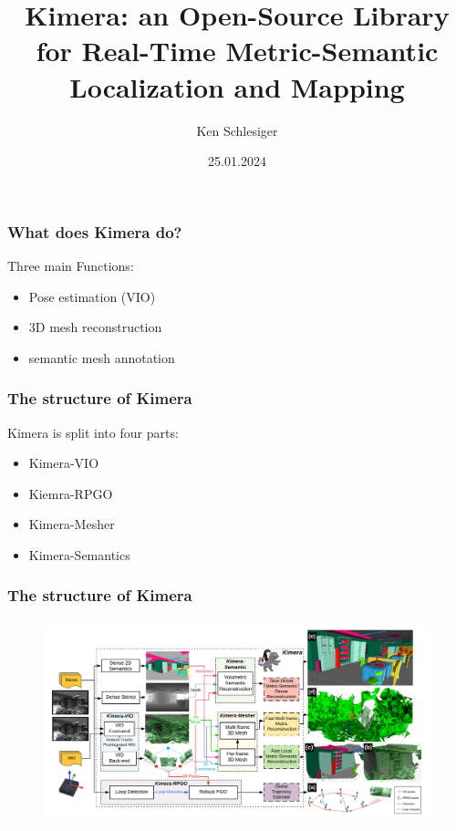 \documentclass[11pt]{beamer}
\title{Kimera: an Open-Source Library for Real-Time
Metric-Semantic Localization and Mapping}
\author{Ken Schlesiger}
\institute{Universität Würzburg}
\date{25.01.2024}
\begin{document}

\frame[plain]{\titlepage}

\begin{frame}
\frametitle{}
\end{frame}
\begin{frame}
\frametitle{What does Kimera do?}
Three main Functions: 
\begin{itemize}
    \item Pose estimation (VIO) 
    \item 3D mesh reconstruction
    \item semantic mesh annotation
\end{itemize}
\end{frame}
\begin{frame}
\frametitle{The structure of Kimera}
Kimera is split into four parts:
\begin{itemize}
    \item Kimera-VIO
    \item Kiemra-RPGO
    \item Kimera-Mesher
    \item Kimera-Semantics
\end{itemize}
\end{frame}
\begin{frame}
\frametitle{The structure of Kimera}
\begin{figure}
    \includegraphics[width=\linewidth]{kimera_chart_23.jpeg} 
\end{figure}
\end{frame}
\end{document}
